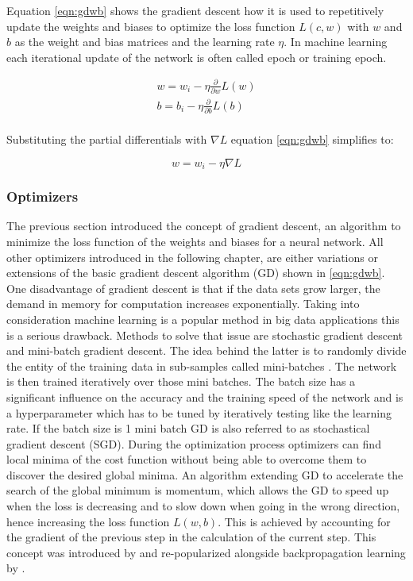 Equation \ref{eqn:gdwb} shows the gradient descent how it is used to repetitively update the weights and
biases to optimize the loss function $L(c,w)$ with $w$ and $b$ as the weight and bias matrices and the
learning rate $\eta$. In machine learning each iterational update of the network is often called epoch or
training epoch.


\begin{subequations}
 \begin{align}
  w = w_i - \eta \frac{\partial}{\partial w}L(w) \\
  b = b_i - \eta \frac{\partial}{\partial b}L(b) \\
 \end{align}
 \label{eqn:gdwb}
\end{subequations}


Substituting the partial differentials with $\nabla L$ equation \ref{eqn:gdwb}  simplifies to:

\begin{equation}
 w = w_i - \eta \nabla L
 \label{eqn:simplegd} 
\end{equation}

\subsubsection{Optimizers}
The previous section introduced the concept of gradient descent, an algorithm to minimize the loss function of
the weights and biases for a neural network. All other optimizers introduced in the following chapter, are
either variations or extensions of the basic gradient descent algorithm (GD) shown in \ref{eqn:gdwb}.\\
One disadvantage of gradient descent is that if the data sets grow larger, the demand in memory for
computation increases exponentially. Taking into consideration machine learning is a popular method in big
data applications this is a serious drawback. Methods to solve that issue are stochastic gradient descent and
mini-batch gradient descent. The idea behind the latter is to randomly divide the entity of the training data
in sub-samples called mini-batches \cite{bottou-bousquet-2008}. The network is then trained iteratively over
those mini batches. The batch size has a significant influence on the accuracy and the training speed of the
network and is a hyperparameter which has to be tuned by iteratively testing like the learning rate. If the
batch size is 1 mini batch GD is also referred to as stochastical gradient descent (SGD). During the
optimization process optimizers can find local minima of the cost function without being able to overcome them
to discover the desired global minima. An algorithm extending GD to accelerate the search of the global minimum
is momentum, which allows the GD to speed up when the loss is decreasing and to slow down when going in the
wrong direction, hence  increasing the loss function $L(w,b)$. This is achieved by accounting for the gradient of
the previous step in the calculation of the current step. This concept was introduced by \cite{polyak1964} and
re-popularized alongside backpropagation learning by \cite{rumelhart1988learning}.

